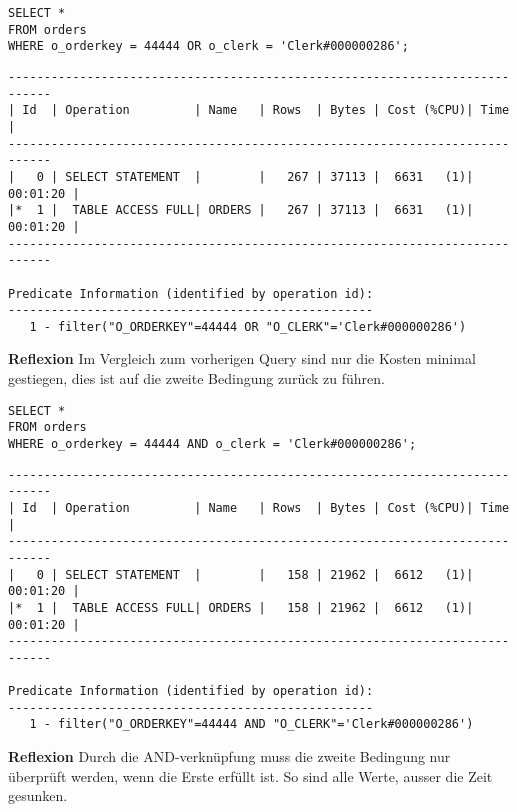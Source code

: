 \documentclass[10pt]{article}
\begin{document}
\begin{lstlisting}[style=sql]
SELECT *
FROM orders
WHERE o_orderkey = 44444 OR o_clerk = 'Clerk#000000286';
\end{lstlisting}
\begin{lstlisting}[style=queryexecutionplan]
----------------------------------------------------------------------------
| Id  | Operation         | Name   | Rows  | Bytes | Cost (%CPU)| Time     |
----------------------------------------------------------------------------
|   0 | SELECT STATEMENT  |        |   267 | 37113 |  6631   (1)| 00:01:20 |
|*  1 |  TABLE ACCESS FULL| ORDERS |   267 | 37113 |  6631   (1)| 00:01:20 |
----------------------------------------------------------------------------

Predicate Information (identified by operation id):
---------------------------------------------------
   1 - filter("O_ORDERKEY"=44444 OR "O_CLERK"='Clerk#000000286')
\end{lstlisting}
\textbf{Reflexion} \newline
Im Vergleich zum vorherigen Query sind nur die Kosten minimal gestiegen, dies 
ist auf die zweite Bedingung zurück zu führen.

\begin{lstlisting}[style=sql]
SELECT *
FROM orders
WHERE o_orderkey = 44444 AND o_clerk = 'Clerk#000000286';
\end{lstlisting}
\begin{lstlisting}[style=queryexecutionplan]
----------------------------------------------------------------------------
| Id  | Operation         | Name   | Rows  | Bytes | Cost (%CPU)| Time     |
----------------------------------------------------------------------------
|   0 | SELECT STATEMENT  |        |   158 | 21962 |  6612   (1)| 00:01:20 |
|*  1 |  TABLE ACCESS FULL| ORDERS |   158 | 21962 |  6612   (1)| 00:01:20 |
----------------------------------------------------------------------------

Predicate Information (identified by operation id):
---------------------------------------------------
   1 - filter("O_ORDERKEY"=44444 AND "O_CLERK"='Clerk#000000286')
\end{lstlisting}
\textbf{Reflexion} \newline
Durch die AND-verknüpfung muss die zweite Bedingung nur überprüft werden, wenn 
die Erste erfüllt ist. So sind alle Werte, ausser die Zeit gesunken.
\end{document}
